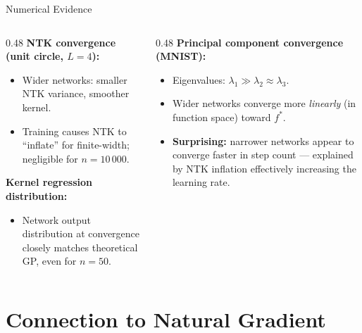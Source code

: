 \documentclass[aspectratio=169, 10pt]{beamer}
\newcommand{\myalert}[1]{\textcolor{red!70!black}{\textbf{#1}}}
\begin{document}
\begin{frame}{Numerical Evidence}
  \begin{columns}[T]
    \begin{column}{0.48\textwidth}
      \textbf{NTK convergence (unit circle, $L=4$):}
      \begin{itemize}
        \item Wider networks: smaller NTK variance, smoother kernel.
        \item Training causes NTK to ``inflate'' for finite-width; negligible for $n=10\,000$.
      \end{itemize}
      \vspace{0.4em}
      \textbf{Kernel regression distribution:}
      \begin{itemize}
        \item Network output distribution at convergence closely matches theoretical GP, even for $n=50$.
      \end{itemize}
    \end{column}
    \begin{column}{0.48\textwidth}
      \textbf{Principal component convergence (MNIST):}
      \begin{itemize}
        \item Eigenvalues: $\lambda_1 \gg \lambda_2 \approx \lambda_3$.
        \item Wider networks converge more \emph{linearly} (in function space) toward $f^*$.
        \item \myalert{Surprising:} narrower networks appear to converge faster in step count — explained by NTK inflation effectively increasing the learning rate.
      \end{itemize}
    \end{column}
  \end{columns}
\end{frame}

\section{Connection to Natural Gradient}
\end{document}
